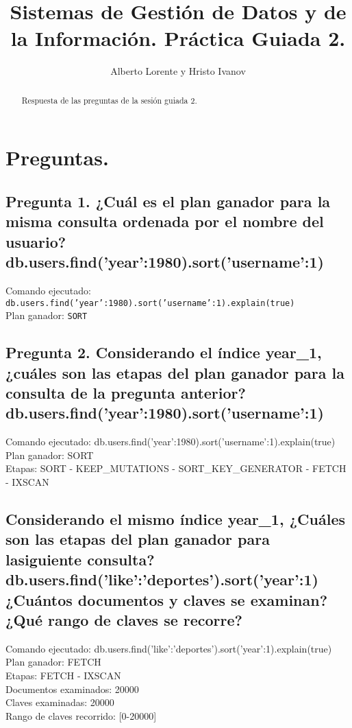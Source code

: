 \documentclass{article}
\begin{document}
\title{Sistemas de Gestión de Datos y de la Información. Práctica Guiada 2.}
\author{Alberto Lorente y Hristo Ivanov}
\maketitle

  \begin{abstract}
     Respuesta de las preguntas de la sesión guiada 2.
  \end{abstract}

  \section{Preguntas.}
    \subsection{Pregunta 1. ¿Cuál es el plan ganador para la misma consulta ordenada por el nombre del usuario? db.users.find({'year':1980}).sort({'username':1})}
     Comando ejecutado: \texttt{db.users.find({'year':1980}).sort({'username':1}).explain(true)} \\
     Plan ganador: \texttt{SORT} \\
    \subsection{Pregunta 2. Considerando el índice year\_1, ¿cuáles son las etapas del plan ganador para la consulta de la pregunta anterior? db.users.find({'year':1980}).sort({'username':1})} 
     Comando ejecutado: db.users.find({'year':1980}).sort({'username':1}).explain(true) \\
     Plan ganador: SORT \\ 
     Etapas: SORT - KEEP\_MUTATIONS - SORT\_KEY\_GENERATOR - FETCH - IXSCAN \\
    \subsection{Considerando el mismo índice year\_1, ¿Cuáles son las etapas del plan ganador para lasiguiente consulta? db.users.find({'like':'deportes'}).sort({'year':1}) ¿Cuántos documentos y claves se examinan? ¿Qué rango de claves se recorre?} 
     Comando ejecutado: db.users.find({'like':'deportes'}).sort({'year':1}).explain(true) \\
     Plan ganador: FETCH \\
     Etapas: FETCH - IXSCAN \\
     Documentos examinados: 20000 \\
     Claves examinadas: 20000 \\
     Rango de claves recorrido: [0-20000] \\
\end{document}
